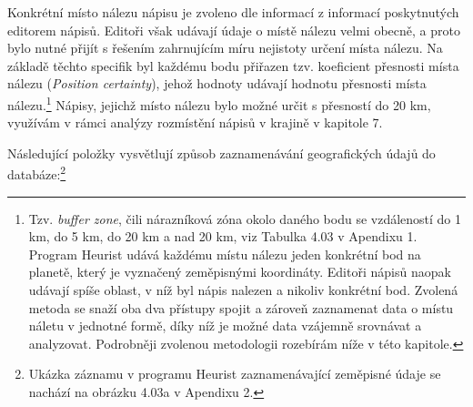 Konkrétní místo nálezu nápisu je zvoleno dle informací z informací poskytnutých editorem nápisů. Editoři však udávají údaje o místě nálezu velmi obecně, a proto bylo nutné přijít s řešením zahrnujícím míru nejistoty určení místa nálezu. Na základě těchto specifik byl každému bodu přiřazen tzv. koeficient přesnosti místa nálezu ({\em Position certainty}), jehož hodnoty udávají hodnotu přesnosti místa nálezu.\footnote{Tzv. {\em buffer zone}, čili nárazníková zóna okolo daného bodu se vzdáleností do 1 km, do 5 km, do 20 km a nad 20 km, viz Tabulka 4.03 v Apendixu 1. Program Heurist udává každému místu nálezu jeden konkrétní bod na planetě, který je vyznačený zeměpisnými koordináty. Editoři nápisů naopak udávají spíše oblast, v níž byl nápis nalezen a nikoliv konkrétní bod. Zvolená metoda se snaží oba dva přístupy spojit a zároveň zaznamenat data o místu náletu v jednotné formě, díky níž je možné data vzájemně srovnávat a analyzovat. Podrobněji zvolenou metodologii rozebírám níže v této kapitole.} Nápisy, jejichž místo nálezu bylo možné určit s přesností do 20 km, využívám v rámci analýzy rozmístění nápisů v krajině v kapitole 7.

Následující položky vysvětlují způsob zaznamenávání geografických údajů do databáze:\footnote{Ukázka záznamu v programu Heurist zaznamenávající zeměpisné údaje se nachází na obrázku 4.03a v Apendixu 2.}

